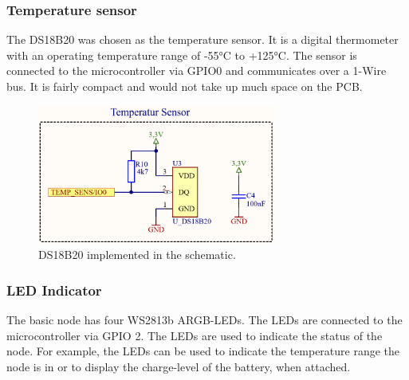     
    \subsubsection{Temperature sensor}
        The DS18B20 was chosen as the temperature sensor. It is a digital thermometer
        with an operating temperature range of -55°C to +125°C. The sensor is connected
        to the microcontroller via GPIO0 and communicates over a 1-Wire bus.
        It is fairly compact and would not take up much space on the PCB.

        \begin{figure}[H]
            \centering
            \includegraphics[width=0.7\textwidth]{assets/HW/DS18B20-schematic.png}
            \caption{DS18B20 implemented in the schematic.}
        \end{figure}

    \subsubsection{LED Indicator}
        The basic node has four WS2813b ARGB-LEDs. The LEDs are connected to the 
        microcontroller via GPIO 2. The LEDs are used to indicate the status of the node. 
        For example, the LEDs can be used to indicate the temperature range the node is in
        or to display the charge-level of the battery, when attached.

